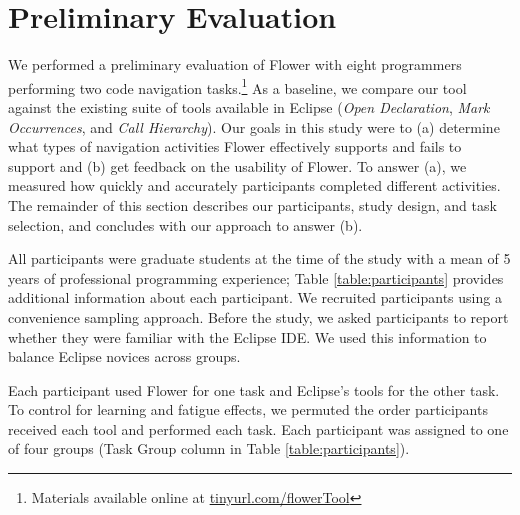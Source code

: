 \documentclass[conference]{IEEEtran}
\begin{document}


\section{Preliminary Evaluation}
We performed a preliminary evaluation of Flower with eight programmers performing two code navigation tasks.\footnote{Materials available online at \url{tinyurl.com/flowerTool}}
As a baseline, we compare our tool against the existing suite of tools available in Eclipse (\emph{Open Declaration}, \emph{Mark Occurrences}, and \emph{Call Hierarchy}).
Our goals in this study were to (a) determine what types of navigation activities Flower  effectively supports and fails to support and (b) get feedback on the usability of Flower.
To answer (a), we measured how quickly and accurately participants completed different activities.
The remainder of this section describes our participants, study design, and task selection, and concludes with our approach to answer (b).

All participants were graduate students at the time of the study with a mean of 5 years of professional programming experience; Table \ref{table:participants} provides additional information about each participant. We recruited participants using a convenience sampling approach. 
Before the study, we asked participants to report whether they were familiar with the Eclipse IDE. We used this information to balance Eclipse novices across groups.

Each participant used Flower for one task and Eclipse's tools for the other task.
To control for learning and fatigue effects, we permuted the order participants received each tool and performed each task. 
Each participant was assigned to one of four groups (Task Group column in Table \ref{table:participants}).
\end{document}

